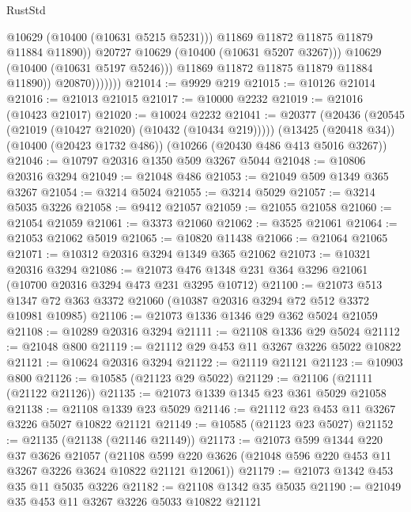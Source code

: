\begin{lexlean}{RustStd}
\begin{coremodule}
                                @10629
                                (@10400 (@10631 @5215 @5231)))
                              @11869
                              @11872
                              @11875
                              @11879
                              @11884
                              @11890))
                          @20727
                          @10629
                          (@10400 (@10631 @5207 @3267)))
                        @10629
                        (@10400 (@10631 @5197 @5246)))
                      @11869
                      @11872
                      @11875
                      @11879
                      @11884
                      @11890))
                  @20870)))))))
@21014 := @9929 @219
@21015 := @10126 @21014
@21016 := @21013 @21015
@21017 := @10000 @2232
@21019 := @21016 (@10423 @21017)
@21020 := @10024 @2232
@21041 := @20377
    (@20436 (@20545 (@21019 (@10427 @21020) (@10432 (@10434 @219)))))
    (@13425 (@20418 @34))
    (@10400 (@20423 @1732 @486))
    (@10266 (@20430 @486 @413 @5016 @3267))
@21046 := @10797 @20316 @1350 @509 @3267 @5044
@21048 := @10806 @20316 @3294
@21049 := @21048 @486
@21053 := @21049 @509 @1349 @365 @3267
@21054 := @3214 @5024
@21055 := @3214 @5029
@21057 := @3214 @5035 @3226
@21058 := @9412 @21057
@21059 := @21055 @21058
@21060 := @21054 @21059
@21061 := @3373 @21060
@21062 := @3525 @21061
@21064 := @21053 @21062 @5019
@21065 := @10820 @11438
@21066 := @21064 @21065
@21071 := @10312 @20316 @3294 @1349 @365 @21062
@21073 := @10321 @20316 @3294
@21086 := @21073 @476 @1348 @231 @364 @3296 @21061 (@10700 @20316 @3294 @473 @231 @3295 @10712)
@21100 := @21073 @513 @1347 @72 @363 @3372 @21060 (@10387 @20316 @3294 @72 @512 @3372 @10981 @10985)
@21106 := @21073 @1336 @1346 @29 @362 @5024 @21059
@21108 := @10289 @20316 @3294
@21111 := @21108 @1336 @29 @5024
@21112 := @21048 @800
@21119 := @21112 @29 @453 @11 @3267 @3226 @5022 @10822
@21121 := @10624 @20316 @3294
@21122 := @21119 @21121
@21123 := @10903 @800
@21126 := @10585 (@21123 @29 @5022)
@21129 := @21106 (@21111 (@21122 @21126))
@21135 := @21073 @1339 @1345 @23 @361 @5029 @21058
@21138 := @21108 @1339 @23 @5029
@21146 := @21112 @23 @453 @11 @3267 @3226 @5027 @10822 @21121
@21149 := @10585 (@21123 @23 @5027)
@21152 := @21135 (@21138 (@21146 @21149))
@21173 := @21073
    @599
    @1344
    @220
    @37
    @3626
    @21057
    (@21108 @599 @220 @3626 (@21048 @596 @220 @453 @11 @3267 @3226 @3624 @10822 @21121 @12061))
@21179 := @21073 @1342 @453 @35 @11 @5035 @3226
@21182 := @21108 @1342 @35 @5035
@21190 := @21049 @35 @453 @11 @3267 @3226 @5033 @10822 @21121

\end{coremodule}
\end{lexlean}
